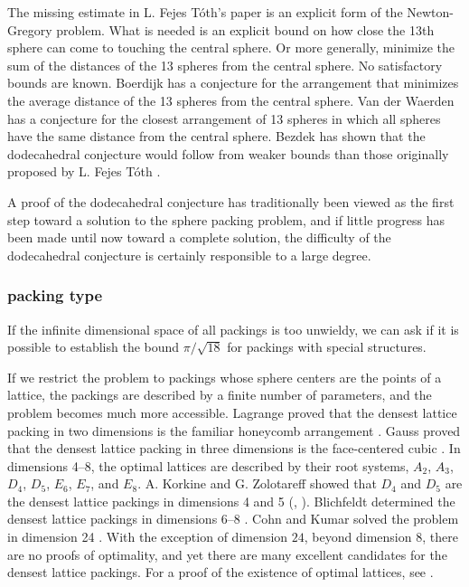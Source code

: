 The missing estimate in L. Fejes T\'oth's paper is an explicit form
of the Newton-Gregory problem.  What is needed is an explicit bound
on how close the 13th sphere can come to touching the central
sphere.  Or more generally, minimize the sum of the distances
of the 13 spheres from the central sphere.
No satisfactory bounds are known.  Boerdijk has a conjecture for the arrangement
that minimizes the average distance of the 13 spheres from the
central sphere.
Van der Waerden
has a conjecture for the closest arrangement of 13 spheres in which
all spheres have the same distance from the central sphere.
Bezdek has shown that the dodecahedral conjecture would follow from
weaker bounds than those originally proposed by L. Fejes T\'oth
\cite{Bez97}.

A proof of the dodecahedral conjecture has traditionally been
viewed as the first step toward a solution to the sphere packing problem,
and if little progress has been made until now toward a complete
solution, the difficulty of the dodecahedral
conjecture is certainly responsible to a large degree.

\subsubsection{packing type}

If the infinite dimensional space of all packings is too unwieldy,
we can ask if it is possible to establish the bound $\pi/\sqrt{18}$
for packings with special structures.

If we restrict the problem
to packings whose sphere centers are the points of a lattice, the
 packings are described by a finite number of parameters, and the
problem becomes much more accessible.  Lagrange proved that the
densest lattice packing in two dimensions is the familiar honeycomb
arrangement \cite{Lag73}. Gauss proved that the densest lattice
packing in three dimensions is the face-centered cubic \cite{Gau31}.
In dimensions 4--8, the optimal lattices are described by their root
systems, $A_2$, $A_3$, $D_4$, $D_5$, $E_6$, $E_7$, and $E_8$. A.
Korkine and G. Zolotareff showed that $D_4$ and $D_5$ are the
densest lattice packings in dimensions 4 and 5 (\cite{KoZ73},
\cite{KoZ77}). Blichfeldt determined the densest lattice packings in
dimensions 6--8 \cite{Bli35}. 
Cohn and Kumar solved the problem in
dimension 24 \cite{CoKu}.  With the exception of dimension $24$,
beyond dimension $8$, there are no proofs of optimality, and yet
there are many excellent candidates for the densest lattice
packings.  For a proof of the existence of optimal lattices, see
\cite{Oes90}.


